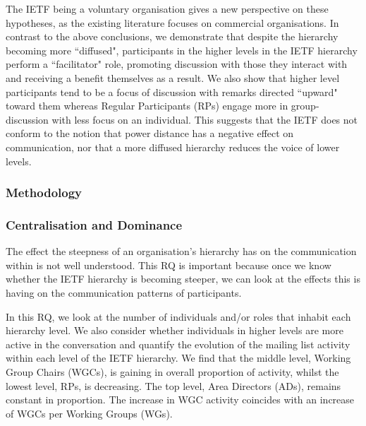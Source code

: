 \documentclass[twocolumn,10pt]{article}
\begin{document}
The IETF being a voluntary organisation gives a new perspective on these
hypotheses, as the existing literature focuses on commercial organisations.
In contrast to the above conclusions, we demonstrate that despite the
hierarchy becoming more ``diffused", participants in the higher levels in
the IETF hierarchy perform a ``facilitator" role, promoting discussion with
those they interact with and receiving a benefit themselves as a result. We
also show that higher level participants tend to be a focus of discussion
with remarks directed ``upward" toward them whereas Regular Participants
(RPs) engage more in group-discussion with less focus on an individual.
This suggests that the IETF does not conform to the notion that power
distance has a negative effect on communication, nor that a more diffused
hierarchy reduces the voice of lower levels.

\subsubsection{Methodology}
\label{sec:org-dynamics:hierarchy:methodology}




\subsubsection{Centralisation and Dominance}
\label{sec:org-dynamics:hierarchy:rq1}



The effect the steepness of an organisation's hierarchy has on the
communication within is not well understood. This RQ is important because
once we know whether the IETF hierarchy is becoming steeper, we can look at
the effects this is having on the communication patterns of participants.

In this RQ, we look at the number of individuals and/or roles that inhabit
each hierarchy level. We also consider whether individuals in higher levels
are more active in the conversation and quantify the evolution of the
mailing list activity within each level of the IETF hierarchy. We find that
the middle level, Working Group Chairs (WGCs), is gaining in overall
proportion of activity, whilst the lowest level, RPs, is decreasing. The
top level, Area Directors (ADs), remains constant in proportion. The
increase in WGC activity coincides with an increase of WGCs per Working
Groups (WGs).
\end{document}
